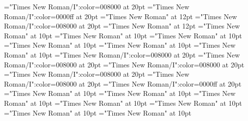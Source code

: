 \documentclass[a4paper]{article}
\begin{document}
\pagestyle{plain}
\sloppy
\setlength{\parfillskip}{0pt plus 1fil}
\font\pronunciationenUSpronunciationarticlebefore="Times New Roman/I":color=008000 at 20pt
\font\pronunciationenUKpronunciationenUSbefore="Times New Roman/I":color=0000ff at 20pt
\font\pronunciationenUSfirstoftypebefore="Times New Roman" at 12pt
\font\pronunciationenUSpronunciationbefore="Times New Roman/I":color=008000 at 20pt
\font\pronunciationenUSbefore="Times New Roman" at 12pt
\font\sectionletterdictionary="Times New Roman" at 10pt
\font\headsectionletterdictionary="Times New Roman" at 10pt
\font\articledictionary="Times New Roman" at 10pt
\font\firstoftypeheadwordlastoftypearticledictionary="Times New Roman" at 10pt
\font\firstoftypegrammarrequireslastoftypearticledictionary="Times New Roman" at 10pt
\font\firstoftypelastoftyperelationsynonymarticledictionary="Times New Roman" at 10pt
\font\firstoftypepronunciationenUKarticledictionary="Times New Roman/I":color=008000 at 20pt
\font\pronunciationfirstoftypebeforearticledictionary="Times New Roman/I":color=008000 at 20pt
\font\firstoftypepronunciationenUSarticledictionary="Times New Roman/I":color=008000 at 20pt
\font\pronunciationenUSfirstoftypebeforearticledictionary="Times New Roman/I":color=008000 at 20pt
\font\lastoftypepronunciationenUKarticledictionary="Times New Roman/I":color=008000 at 20pt
\font\pronunciationenUKpronunciationenUSbeforearticledictionary="Times New Roman/I":color=0000ff at 20pt
\font\firstoftypegrammarcategorylastoftypearticledictionary="Times New Roman" at 10pt
\font{}="Times New Roman" at 10pt
\font\firstoftypelastoftypenotearticledictionary="Times New Roman" at 10pt
\font\exampleusefirstoftypearticledictionary="Times New Roman" at 10pt
\font\examplefirstoftypearticledictionary="Times New Roman" at 10pt
\font\exampleuselastoftypearticledictionary="Times New Roman" at 10pt
\font\examplelastoftypearticledictionary="Times New Roman" at 10pt

\pagestyle{fancy} 


\end{document}

